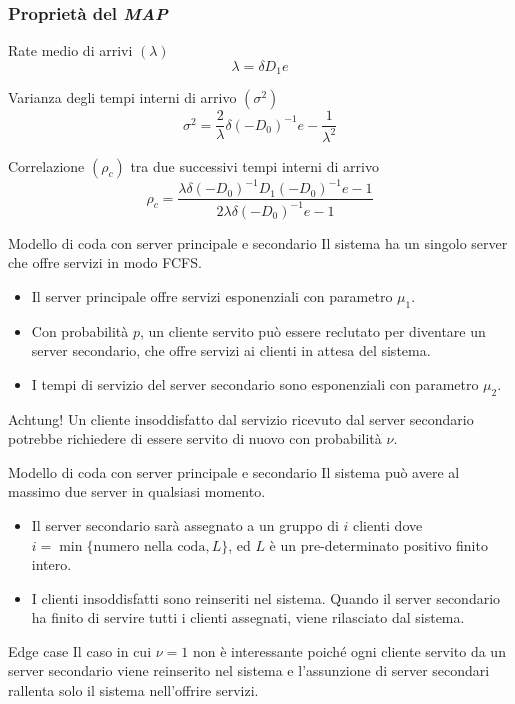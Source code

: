 \documentclass{beamer}
\begin{document}
\begin{frame}
    \frametitle{Proprietà del \emph{MAP}}
        \begin{block}{Rate medio di arrivi $(\lambda)$}
            $$ \lambda = \delta D_1 e$$
        \end{block}
        \begin{block}{Varianza degli tempi interni di arrivo $(\sigma^2)$}
            $$ \sigma^2 = \frac{2}{\lambda} \delta (-D_0)^{-1} e - \frac{1}{\lambda^2}$$
        \end{block}
        \begin{block}{Correlazione $(\rho_c)$ tra due successivi tempi interni di arrivo}
            $$ \rho_c = \frac{\lambda \delta (-D_0)^{-1} D_1 (-D_0)^{-1} e - 1}{2 \lambda \delta (-D_0)^{-1} e - 1}$$
        \end{block}
\end{frame}

\begin{frame}{Modello di coda con server principale e secondario}
    Il sistema ha un singolo server che offre servizi in modo FCFS.
    \begin{itemize}
        \item Il server principale offre servizi esponenziali con parametro $\mu_1$.
        \item  Con probabilità $p$, un cliente servito può essere reclutato per diventare un server secondario, che offre servizi ai clienti in attesa del sistema.
        \item I tempi di servizio del server secondario sono esponenziali con parametro $\mu_2$.
    \end{itemize}
    \begin{block}{Achtung!}
        Un cliente insoddisfatto dal servizio ricevuto dal server secondario potrebbe richiedere di essere servito di nuovo con probabilità $\nu$.
    \end{block}
\end{frame}


\begin{frame}{Modello di coda con server principale e secondario}
    Il sistema può avere al massimo due server in qualsiasi momento.
    \begin{itemize}
        \item Il server secondario sarà assegnato a un gruppo di $i$ clienti dove $i = \min \{\text{numero nella coda}, L\}$, ed $L$ è un pre-determinato positivo finito intero.
        \item I clienti insoddisfatti sono reinseriti nel sistema. Quando il server secondario ha finito di servire tutti i clienti assegnati, viene rilasciato dal sistema.
    \end{itemize}
    \begin{block}{Edge case}
        Il caso in cui $\nu = 1$ non è interessante poiché ogni cliente servito da un server secondario viene reinserito nel sistema e l'assunzione di server secondari rallenta solo il sistema nell'offrire servizi.
    \end{block}
\end{frame}
\end{document}
